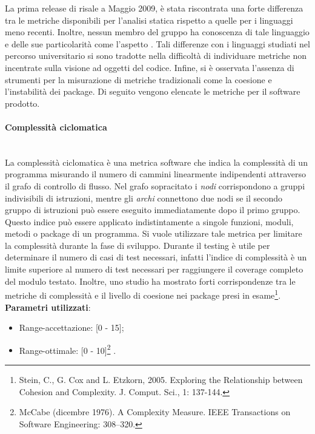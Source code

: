		La prima release di  risale a Maggio 2009, è stata riscontrata una forte differenza tra le metriche disponibili per l'analisi statica rispetto a quelle per i linguaggi meno recenti. Inoltre, nessun membro del gruppo ha conoscenza di tale linguaggio e delle sue particolarità come l'aspetto . Tali differenze con i linguaggi studiati nel percorso universitario si sono tradotte nella difficoltà di individuare metriche non incentrate sulla visione ad oggetti del codice. Infine, si è osservata l'assenza di strumenti per la misurazione di metriche tradizionali come la coesione e l'instabilità dei package.
		Di seguito vengono elencate le metriche per il software prodotto.
		
			\paragraph{Complessità ciclomatica}\mbox{} \\
				
			La complessità ciclomatica è una metrica software che indica la complessità di un programma misurando il numero di cammini linearmente indipendenti attraverso il grafo di controllo di flusso. Nel grafo sopracitato i \emph{nodi} corrispondono a gruppi indivisibili di istruzioni, mentre gli \emph{archi} connettono due nodi se il secondo gruppo di istruzioni può essere eseguito immediatamente dopo il primo gruppo.
			Questo indice può essere applicato indistintamente a singole funzioni, moduli, metodi o package di un programma.
			Si vuole utilizzare tale metrica per limitare la complessità durante la fase di sviluppo.
			Durante il testing è utile per determinare il numero di casi di test necessari, infatti l'indice di complessità è un limite superiore al numero di test necessari per raggiungere il coverage completo del modulo testato. Inoltre, uno studio ha mostrato forti corrispondenze tra le metriche di complessità e il livello di coesione nei package presi in esame\footnote{Stein, C., G. Cox and L. Etzkorn, 2005. Exploring the Relationship between Cohesion and Complexity. J. Comput. Sci., 1: 137-144.}.\\
			\textbf{Parametri utilizzati}:
			\begin{itemize}
				\item Range-accettazione: [0 - 15];
				\item Range-ottimale: [0 - 10]\footnote{McCabe (dicembre 1976). A Complexity Measure. IEEE Transactions on Software Engineering: 308–320.} .
			\end{itemize}

